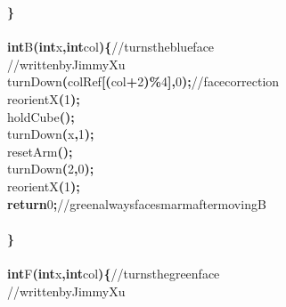 \documentclass[a4paper, 10pt]{article}
\newcommand\SPC{\hspace*{0.6em}}
\newcommand\TAB{\hspace*{1.2em}}
\newcommand{\CppAComment}[1]{\textcolor[rgb]{0,0.5,0}{\colorbox[rgb]{1,1,1}{#1}}}
\newcommand{\CppAIdentifier}[1]{#1}
\newcommand{\CppANumber}[1]{\textcolor[rgb]{0,0,1}{\colorbox[rgb]{1,1,1}{#1}}}
\newcommand{\CppAReservedWord}[1]{\textbf{\colorbox[rgb]{1,1,1}{#1}}}
\newcommand{\CppASpace}[1]{\colorbox[rgb]{1,1,1}{#1}}
\newcommand{\CppASymbol}[1]{\textbf{\textcolor[rgb]{1,0,0}{\colorbox[rgb]{1,1,1}{#1}}}}
\begin{document}
\begin{ttfamily}
\CppASymbol{\}}\\
\\
\CppAReservedWord{int}\CppASpace{\SPC }\CppAIdentifier{B}\CppASymbol{(}\CppAReservedWord{int}\CppASpace{\SPC }\CppAIdentifier{x}\CppASymbol{,}\CppASpace{\SPC }\CppAReservedWord{int}\CppASpace{\SPC }\CppAIdentifier{col}\CppASymbol{)}\CppASymbol{\{}\CppASpace{\SPC }\CppAComment{//\SPC turns\SPC the\SPC blue\SPC face}\\
\CppASpace{\TAB }\CppAComment{//\SPC written\SPC by\SPC Jimmy\SPC Xu}\\
\CppASpace{\TAB }\CppAIdentifier{turnDown}\CppASymbol{(}\CppAIdentifier{colRef}\CppASymbol{[}\CppASymbol{(}\CppAIdentifier{col}\CppASymbol{+}\CppANumber{2}\CppASymbol{)}\CppASymbol{\%}\CppANumber{4}\CppASymbol{]}\CppASymbol{,}\CppANumber{0}\CppASymbol{)}\CppASymbol{;}\CppASpace{\SPC }\CppAComment{//\SPC face\SPC correction}\\
\CppASpace{\TAB }\CppAIdentifier{reorientX}\CppASymbol{(}\CppANumber{1}\CppASymbol{)}\CppASymbol{;}\\
\CppASpace{\TAB }\CppAIdentifier{holdCube}\CppASymbol{(}\CppASymbol{)}\CppASymbol{;}\\
\CppASpace{\TAB }\CppAIdentifier{turnDown}\CppASymbol{(}\CppAIdentifier{x}\CppASymbol{,}\CppANumber{1}\CppASymbol{)}\CppASymbol{;}\\
\CppASpace{\TAB }\CppAIdentifier{resetArm}\CppASymbol{(}\CppASymbol{)}\CppASymbol{;}\\
\CppASpace{\TAB }\CppAIdentifier{turnDown}\CppASymbol{(}\CppANumber{2}\CppASymbol{,}\CppANumber{0}\CppASymbol{)}\CppASymbol{;}\\
\CppASpace{\TAB }\CppAIdentifier{reorientX}\CppASymbol{(}\CppANumber{1}\CppASymbol{)}\CppASymbol{;}\\
\CppASpace{\TAB }\CppAReservedWord{return}\CppASpace{\SPC }\CppANumber{0}\CppASymbol{;}\CppASpace{\SPC }\CppAComment{//\SPC green\SPC always\SPC faces\SPC marm\SPC after\SPC moving\SPC B}\\
\\
\CppASymbol{\}}\\
\\
\CppAReservedWord{int}\CppASpace{\SPC }\CppAIdentifier{F}\CppASymbol{(}\CppAReservedWord{int}\CppASpace{\SPC }\CppAIdentifier{x}\CppASymbol{,}\CppASpace{\SPC }\CppAReservedWord{int}\CppASpace{\SPC }\CppAIdentifier{col}\CppASymbol{)}\CppASymbol{\{}\CppASpace{\SPC }\CppAComment{//\SPC turns\SPC the\SPC green\SPC face}\\
\CppASpace{\TAB }\CppAComment{//\SPC written\SPC by\SPC Jimmy\SPC Xu}\\

\end{ttfamily}
\end{document}
